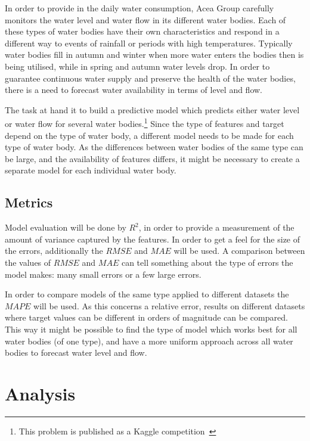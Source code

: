 \documentclass{article}
\begin{document}
In order to provide in the daily water consumption, Acea Group carefully monitors the water level and water flow in its different water bodies. Each of these types of water bodies have their own characteristics and respond in a different way to events of rainfall or periods with high temperatures. Typically water bodies fill in autumn and winter when more water enters the bodies then is being utilised, while in spring and autumn water levels drop. In order to guarantee continuous water supply and preserve the health of the water bodies, there is a need to forecast water availability in terms of level and flow.

The task at hand it to build a predictive model which predicts either water level or water flow for several water bodies.\footnote{This problem is published as a Kaggle competition~\cite{kaggle}} Since the type of features and target depend on the type of water body, a different model needs to be made for each type of water body. As the differences between water bodies of the same type can be large, and the availability of features differs, it might be necessary to create a separate model for each individual water body. 


\subsection*{Metrics}

Model evaluation will be done by $R^2$, in order to provide a measurement of the amount of variance captured by the features. In order to get a feel for the size of the errors, additionally the $RMSE$ and $MAE$ will be used. A comparison between the values of $RMSE$ and $MAE$ can tell something about the type of errors the model makes: many small errors or a few large errors. 

In order to compare models of the same type applied to different datasets the $MAPE$ will be used. As this concerns a relative error, results on different datasets where target values can be different in orders of magnitude can be compared. This way it might be possible to find the type of model which works best for all water bodies (of one type), and have a more uniform approach across all water bodies to forecast water level and flow.


\section{Analysis}
\end{document}
